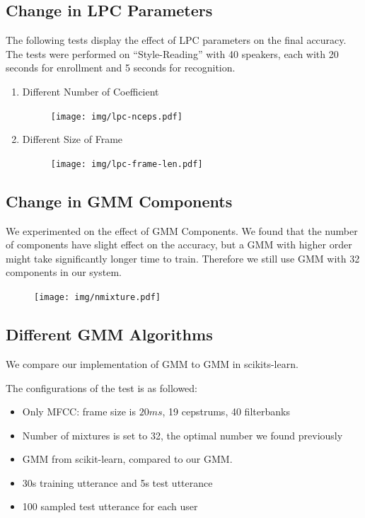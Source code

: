 \subsection{Change in LPC Parameters}
The following tests display the effect of LPC parameters on the final accuracy.
The tests were performed on ``Style-Reading'' with 40 speakers, each with 20 seconds for enrollment
and 5 seconds for recognition.
\begin{enumerate}
  \item Different Number of Coefficient
    \begin{figure}[H]
      \centering
      \texttt{[image: img/lpc-nceps.pdf]}
    \end{figure}

  \item Different Size of Frame
    \begin{figure}[H]
      \centering
      \texttt{[image: img/lpc-frame-len.pdf]}
    \end{figure}
\end{enumerate}

\subsection{Change in GMM Components}

We experimented on the effect of GMM Components. We found that the number of components
have slight effect on the accuracy, but a GMM with higher order might take
significantly longer time to train. Therefore we still use GMM with 32 components in our system.

\begin{figure}[H]
  \centering
  \texttt{[image: img/nmixture.pdf]}
\end{figure}

\subsection{Different GMM Algorithms}
We compare our implementation of GMM to GMM in scikits-learn.

The configurations of the test is as followed:
\begin{itemize}
    \item Only MFCC: frame size is $20 ms $, 19 cepstrums, 40 filterbanks
	\item Number of mixtures is set to 32, the optimal number we found previously
	\item GMM from scikit-learn, compared to our GMM.
	\item 30s training utterance and 5s test utterance
	\item 100 sampled test utterance for each user
\end{itemize}

